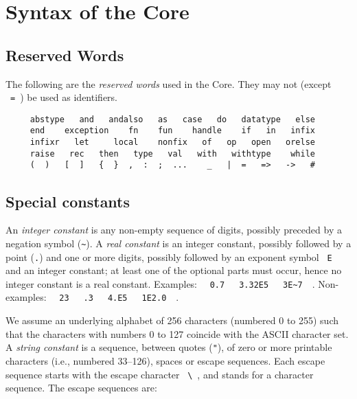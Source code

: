 \section{Syntax of the Core}
\label{syn-core-sec}

\subsection{Reserved Words}
The
following are the {\sl reserved words} used in the Core.   They
may not (except ~{\tt =}~) be used as identifiers.   

\vspace*{-6pt}
\begin{verbatim}
     abstype   and   andalso   as   case   do   datatype   else
     end    exception    fn    fun    handle    if   in   infix
     infixr   let     local    nonfix   of   op   open   orelse
     raise   rec   then   type   val   with   withtype    while
     (  )   [  ]   {  }  ,  :  ;  ...    _   |  =   =>   ->   #   
\end{verbatim}
\vspace*{-6pt}

\subsection{Special constants}
\label{cr:speccon}
An {\sl integer constant} 
is any non-empty sequence of digits, possibly preceded
by a negation symbol (\verb+~+).
A {\sl real constant} is an integer constant,
possibly followed by a point ({\tt .}) and one or
more digits, possibly followed by an exponent symbol ~{\tt E}~ and an integer
constant; at least one of the optional parts must occur, hence no integer
constant is a real constant.
Examples: ~~{\tt 0.7}~~~{\tt 3.32E5}~~~\verb(3E~7(~~.  Non-examples:
~~{\tt 23}~~~{\tt .3}~~~{\tt 4.E5}~~~{\tt 1E2.0}~~.

We assume an underlying alphabet of 256 characters 
(numbered 0 to 255) such that the characters with numbers 
0 to 127 coincide with the ASCII character set.
A {\sl string constant} is a sequence, between quotes ({\tt "}), of zero or
more printable characters (i.e., numbered 33--126), spaces or escape 
sequences.
Each escape sequence starts with the
escape character ~\verb+\+~, and stands for a character sequence. The
escape sequences are:
\smallskip

